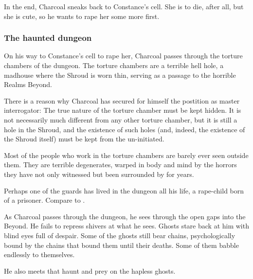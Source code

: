 \begin{garbage}
In the end, Charcoal sneaks back to Constance's cell. She is to die, after all, but she is cute, so he wants to rape her some more first. 






\subsubsection{The haunted dungeon}
On his way to Constance's cell to rape her, Charcoal passes through the torture chambers of the dungeon. The torture chambers are a terrible hell hole, a madhouse where the Shroud is worn thin, serving as a passage to the horrible Realms Beyond. 

There is a reason why Charcoal has secured for himself the postition as master interrogator: 
The true nature of the torture chamber must be kept hidden. 
It is not necessarily much different from any other torture chamber, but it is still a hole in the Shroud, and the existence of such holes (and, indeed, the existence of the Shroud itself) must be kept from the un-initiated. 

Most of the people who work in the torture chambers are barely ever seen outside them. They are terrible degenerates, warped in body and mind by the horrors they have not only witnessed but been surrounded by for years. 

Perhaps one of the guards has lived in the dungeon all his life, a rape-child born of a prisoner. 
Compare to \cite{VictorHugo:HunchbackofNotreDame}.

As Charcoal passes through the dungeon, he sees through the open gaps into the Beyond. He fails to repress shivers at what he sees. Ghosts stare back at him with blind eyes full of despair. Some of the ghosts still bear chains, psychologically bound by the chains that bound them until their deaths. 
Some of them babble endlessly to themselves. 

He also meets \daemons{} that haunt and prey on the hapless ghosts. 










\end{garbage}
